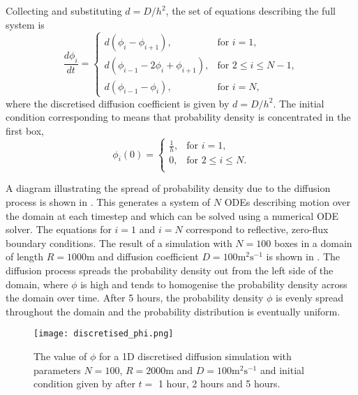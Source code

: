  Collecting  and substituting $d = D/h^2$, the set of equations describing the full system is
 \begin{equation}
 \frac{d\phi_i}{dt} = \begin{cases}
 		d(\phi_i - \phi_{i+1}), & \text{for } i = 1, \\
 		d(\phi_{i-1}-2\phi_i +\phi_{i+1}), & \text{for } 2 \leq i \leq N-1, \\
 		d(\phi_{i-1}-\phi_i), & \text{for } i = N ,
 		\end{cases}
         \label{eqn:discrete_diffusion}
 \end{equation}
 where the discretised diffusion coefficient is given by
 $d = D/h^2$.
  The initial condition corresponding to  means that probability density is concentrated in the first box,
 \begin{equation}
 \phi_i(0) = \begin{cases}
 		\frac{1}{h}, & \text{for } i = 1, \\
 		0, & \text{for } 2 \leq i \leq N. \\
 		\end{cases}
         \label{eqn:discrete_diffusion_IC}
 \end{equation}

 A diagram illustrating the spread of probability density due to the diffusion process is shown in . This generates a system of $N$ ODEs describing motion over
 the domain at each timestep and which can be solved using a numerical ODE solver. The equations for $i=1$ and $i=N$ correspond to reflective, zero-flux boundary conditions.  The result of a simulation with $N = 100$ boxes in a domain of
 length $R = 1000$m and diffusion coefficient $D = 100\mathrm{m^2s^{-1}}$ is shown in
 . The diffusion process spreads the probability density out from the left side of the domain, where $\phi$ is high and tends to homogenise the probability density across the domain over time. After 5 hours, the probability density $\phi$ is evenly spread throughout the domain and the probability distribution is eventually uniform.

 \begin{figure} [t]
     \centering
         \texttt{[image: discretised\_phi.png]}
         \caption{The value of $\phi$ for a 1D discretised diffusion simulation with parameters $N = 100$, $R = 2000\mathrm{m}$ and $D = 100\mathrm{m^2s^{-1}}$ and initial condition given by  after $t = $ 1 hour, 2 hours and 5 hours.}
     \label{fig:discretised_phi}
 \end{figure}


